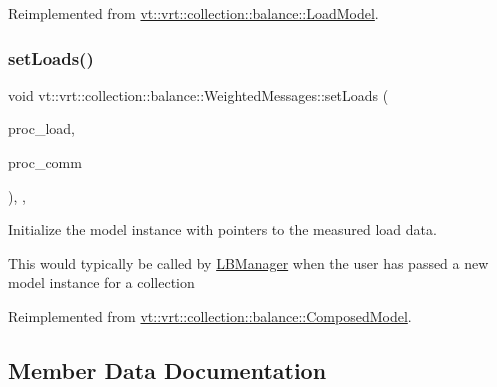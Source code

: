 Reimplemented from \hyperlink{structvt_1_1vrt_1_1collection_1_1balance_1_1_load_model_a1143c5dda0d3e409db174d5de6bfceb5}{vt\+::vrt\+::collection\+::balance\+::\+Load\+Model}.

\mbox{\label{structvt_1_1vrt_1_1collection_1_1balance_1_1_weighted_messages_ad0e6b88668ac59f4fb376a2dba81e593}} 
\subsubsection{\texorpdfstring{set\+Loads()}{setLoads()}}
{\footnotesize\ttfamily void vt\+::vrt\+::collection\+::balance\+::\+Weighted\+Messages\+::set\+Loads (\begin{DoxyParamCaption}\item[{std\+::unordered\+\_\+map$<$ \hyperlink{namespacevt_a46ce6733d5cdbd735d561b7b4029f6d7}{Phase\+Type}, \hyperlink{namespacevt_1_1vrt_1_1collection_1_1balance_a5339303db2e1ce964d783a53fd74e6b1}{Load\+Map\+Type} $>$ const $\ast$}]{proc\+\_\+load,  }\item[{std\+::unordered\+\_\+map$<$ \hyperlink{namespacevt_a46ce6733d5cdbd735d561b7b4029f6d7}{Phase\+Type}, \hyperlink{namespacevt_1_1vrt_1_1collection_1_1balance_a01ee1fb0ae2da1d2ab7fdca3be9ae351}{Comm\+Map\+Type} $>$ const $\ast$}]{proc\+\_\+comm }\end{DoxyParamCaption})\hspace{0.3cm}{\ttfamily [inline]}, {\ttfamily [override]}, {\ttfamily [virtual]}}



Initialize the model instance with pointers to the measured load data. 

This would typically be called by \hyperlink{structvt_1_1vrt_1_1collection_1_1balance_1_1_l_b_manager}{L\+B\+Manager} when the user has passed a new model instance for a collection 

Reimplemented from \hyperlink{classvt_1_1vrt_1_1collection_1_1balance_1_1_composed_model_a3a7da5e81a933ea88f87a1226fd3b401}{vt\+::vrt\+::collection\+::balance\+::\+Composed\+Model}.



\subsection{Member Data Documentation}
\mbox{\label{structvt_1_1vrt_1_1collection_1_1balance_1_1_weighted_messages_a0c7747d5f3021dc4a89858a99060c095}} 
